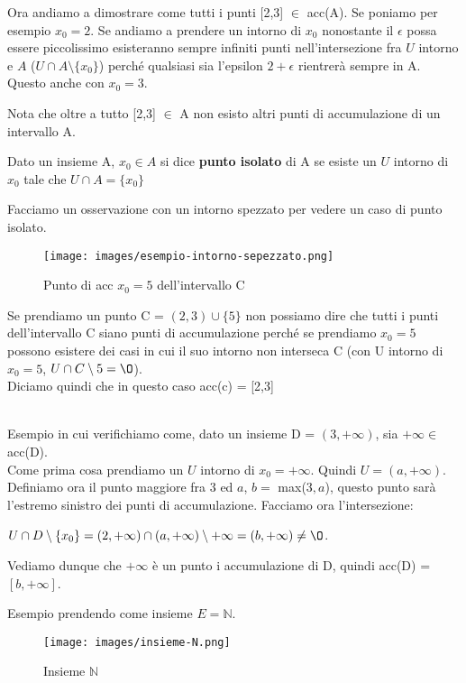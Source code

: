 Ora andiamo a dimostrare come tutti i punti [2,3] $\in$ acc(A).
Se poniamo per esempio $x_0 = 2$. Se andiamo a prendere un intorno di $x_0$ nonostante il $\epsilon$ possa essere piccolissimo esisteranno sempre infiniti punti nell'intersezione fra $U$ intorno e $A$ ($U \cap A \setminus \{x_0\}$) perché qualsiasi sia l'epsilon $2 + \epsilon$ rientrerà sempre in A.\\
Questo anche con $x_0 = 3$. 
\begin{note}
Nota che oltre a tutto [2,3] $\in$ A non esisto altri punti di accumulazione di un intervallo A.
\end{note}

\begin{definition}
    Dato un insieme A, $x_0 \in A$ si dice \textbf{punto isolato} di A se esiste un $U$ intorno di $x_0$ tale che $U \cap A = \{x_0\}$
\end{definition}
\begin{example}
    Facciamo un osservazione con un intorno spezzato per vedere un caso di punto isolato.
\end{example}
\begin{wrapfigure}{l}{8cm}
    \centering
    \texttt{[image: images/esempio-intorno-sepezzato.png]}
    \caption{Punto di acc $x_0 = 5$ dell'intervallo C}
\end{wrapfigure}

Se prendiamo un punto C = $(2,3) \cup \{5\}$ non possiamo dire che tutti i punti dell'intervallo C siano punti di accumulazione perché se prendiamo $x_0 = 5$ possono esistere dei casi in cui il suo intorno non interseca C (con U intorno di $x_0 = 5$, $U \cap C \setminus {5} = \O$).\\
Diciamo quindi che in questo caso acc(c) = [2,3]\\\\
\begin{example}
    Esempio in cui verifichiamo come, dato un insieme D = $(3, +\infty)$, sia $+\infty \in$ acc(D).\\
    Come prima cosa prendiamo un $U$ intorno di $x_0 = +\infty$. Quindi $U = (a, +\infty)$.\\
    Definiamo ora il punto maggiore fra 3 ed $a$, $b =$ max($3,a$), questo punto sarà l'estremo sinistro dei punti di accumulazione.
    Facciamo ora l'intersezione:
    \begin{center}
        $U \cap D \setminus \{x_0\} = (2, +\infty) \cap (a, +\infty) \setminus {+\infty} = (b, +\infty) \neq \O$.
    \end{center}
    Vediamo dunque che $+\infty$ è un punto i accumulazione di D, quindi acc(D) = $[b, +\infty]$.
\end{example}
\newpage
\begin{example}
    Esempio prendendo come insieme $E = \mathbb{N}$.
\end{example}
\begin{wrapfigure}{r}{7cm}
    \vspace{-15pt}
    \centering
    \texttt{[image: images/insieme-N.png]}
    \caption{Insieme $\mathbb{N}$}
    \label{fig:insieme-N}
\end{wrapfigure}

